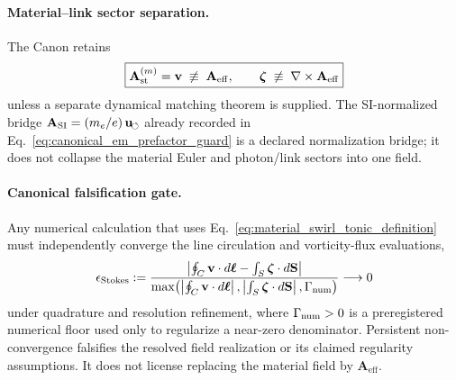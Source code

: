     \paragraph{Material--link sector separation.}
    The Canon retains
    \begin{align}
        \boxed{
        \mathbf A_{\rm st}^{(m)}=\mathbf v
        \;\not\equiv\;
        \mathbf A_{\mathrm{eff}},
        \qquad
        \boldsymbol{\zeta}
        \;\not\equiv\;
        \nabla\times\mathbf A_{\mathrm{eff}}
        }
        \label{eq:material_swirl_tonic_link_guard}
    \end{align}
    unless a separate dynamical matching theorem is supplied.  The SI-normalized
    bridge $\mathbf A_{\rm SI}=(m_e/e)\,\mathbf u_{\!\boldsymbol{\circlearrowleft}}$
    already recorded in
    Eq.~\eqref{eq:canonical_em_prefactor_guard} is a declared normalization bridge;
    it does not collapse the material Euler and photon/link sectors into one field.

    \paragraph{Canonical falsification gate.}
    Any numerical calculation that uses
    Eq.~\eqref{eq:material_swirl_tonic_definition} must independently converge the
    line circulation and vorticity-flux evaluations,
    \begin{align}
        \epsilon_{\rm Stokes}
        :=
        \frac{
        \left|
        \oint_C\mathbf v\cdot d\boldsymbol\ell
        -
        \int_S\boldsymbol{\zeta}\cdot d\mathbf S
        \right|
        }{
        \max\!\left(
        \left|\oint_C\mathbf v\cdot d\boldsymbol\ell\right|,
        \left|\int_S\boldsymbol{\zeta}\cdot d\mathbf S\right|,
        \Gamma_{\rm num}
        \right)
        }
        \longrightarrow0
        \label{eq:material_swirl_tonic_stokes_falsifier}
    \end{align}
    under quadrature and resolution refinement, where $\Gamma_{\rm num}>0$ is a
    preregistered numerical floor used only to regularize a near-zero denominator.
    Persistent non-convergence falsifies the resolved field realization or its
    claimed regularity assumptions.  It does not license replacing the material
    field by $\mathbf A_{\mathrm{eff}}$.
